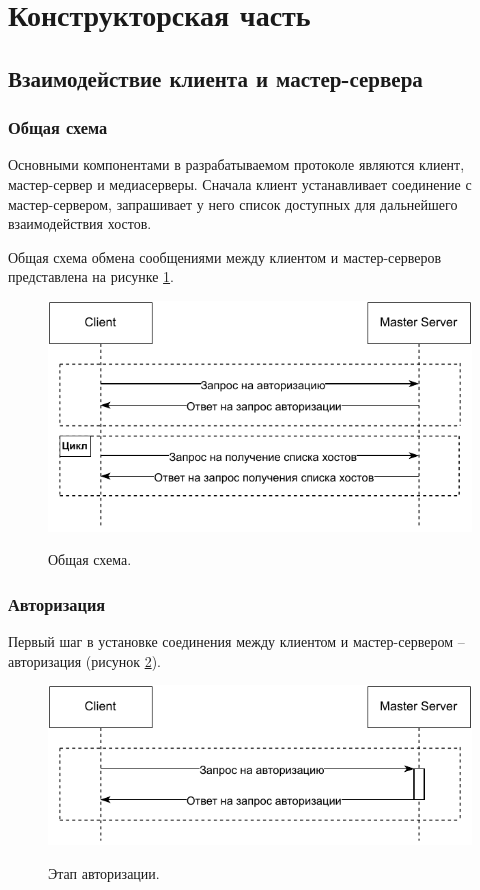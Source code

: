 \section{Конструкторская часть}
\subsection{Взаимодействие клиента и мастер-сервера}
\subsubsection{Общая схема}
Основными компонентами в разрабатываемом протоколе являются клиент, мастер-сервер и медиасерверы. Сначала клиент устанавливает соединение с мастер-сервером, запрашивает у него список доступных для дальнейшего взаимодействия хостов.

Общая схема обмена сообщениями между клиентом и мастер-серверов представлена на рисунке \ref{image:general}. 

\begin{figure}[h!]
	\begin{center}
		{\includegraphics[scale = 1]{img/[general][master].pdf}}
		\caption{Общая схема.}
		\label{image:general}
	\end{center}
\end{figure}

\subsubsection{Авторизация}
Первый шаг в установке соединения между клиентом и мастер-сервером -- авторизация (рисунок \ref{image:auth}). 

\begin{figure}[h!]
	\begin{center}
		{\includegraphics[scale = 1]{img/[items][master][auth].pdf}}
		\caption{Этап авторизации.}
		\label{image:auth}
	\end{center}
\end{figure}

